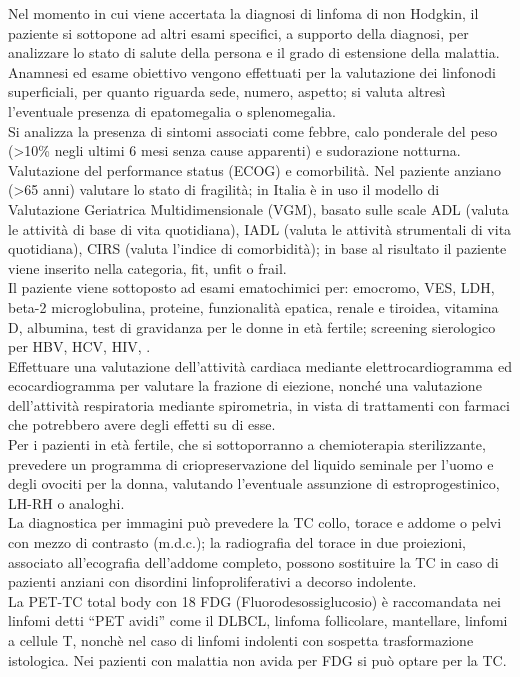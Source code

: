 Nel momento in cui viene accertata la diagnosi di linfoma di non Hodgkin, il paziente si sottopone ad altri 
esami specifici, a supporto della diagnosi, per analizzare lo stato di salute della persona e il grado di 
estensione della malattia.\\
Anamnesi ed esame obiettivo vengono effettuati per la valutazione dei linfonodi superficiali, per quanto 
riguarda sede, numero, aspetto; si valuta altresì l'eventuale presenza di epatomegalia o splenomegalia.\\
Si analizza la presenza di sintomi associati come febbre, calo ponderale del peso 
(>10\% negli ultimi 6 mesi senza cause apparenti) e sudorazione notturna\cite{reteveneta}.\\
Valutazione del performance status (ECOG) e comorbilità. 
Nel paziente anziano (>65 anni) valutare lo stato di fragilità; in Italia è in uso il modello di 
Valutazione Geriatrica Multidimensionale (VGM), basato sulle scale ADL (valuta le attività di base di vita quotidiana),
IADL (valuta le attività strumentali di vita quotidiana), CIRS (valuta l’indice di comorbidità); 
in base al risultato il paziente viene inserito nella categoria, fit, unfit o frail\cite{reteveneta}.\\
Il paziente viene sottoposto ad esami ematochimici per: emocromo, VES, LDH, beta-2 microglobulina, proteine, 
funzionalità epatica, renale e tiroidea, vitamina D, albumina, test di gravidanza per le donne in età fertile; 
screening sierologico per HBV, HCV, HIV\cite{AIOM}, \cite{reteveneta}.\\
Effettuare una valutazione dell’attività cardiaca mediante elettrocardiogramma ed ecocardiogramma per valutare 
la frazione di eiezione, nonché una valutazione dell’attività respiratoria mediante spirometria, in vista di 
trattamenti con farmaci che potrebbero avere degli effetti su di esse\cite{AIOM}.\\ 
Per i pazienti in età fertile, che si sottoporranno a chemioterapia sterilizzante, prevedere un programma di 
criopreservazione del liquido seminale per l’uomo e degli ovociti per la donna, valutando l’eventuale assunzione di 
estroprogestinico, LH-RH o analoghi\cite{AIOM}.\\

La diagnostica per immagini può prevedere la TC collo, torace e addome o pelvi con mezzo di contrasto (m.d.c.); 
la radiografia del torace in due proiezioni, associato all’ecografia dell’addome completo, possono sostituire 
la TC in caso di pazienti anziani con disordini linfoproliferativi a decorso indolente.\\
La PET-TC total body con 18 FDG (Fluorodesossiglucosio) è raccomandata nei linfomi detti “PET avidi” come il DLBCL, 
linfoma follicolare, mantellare, linfomi a cellule T, nonchè nel caso di linfomi indolenti con 
sospetta trasformazione istologica. Nei pazienti con malattia non avida per FDG si può optare per la TC\cite{reteveneta}.\\ 

